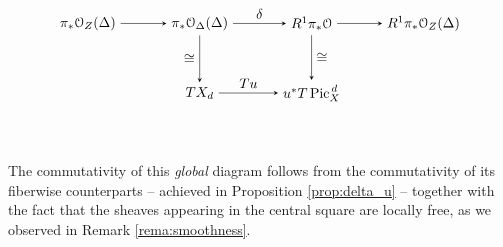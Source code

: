 		$$
		\begin{tikzpicture}[node distance=8em, auto]
			\node (A) 									{$\pi_* \calO_Z(\Delta)$};
			\node (B) 	[right of=A]		{$\pi_* \calO_\Delta(\Delta)$};
		  \node (C) 	[right of=B] 	{$R^1 \pi_* \calO$};
		  \node (D) 	[right of=C] 	{$R^1 \pi_* \calO_Z(\Delta)$};
		  \node (A') 	[below of=A] 		{$\;$};
		  \node (B') 	[below of=B, yshift=3em] 		{$ T \Dd$};
		  \node (C') 	[below of=C, yshift=3em] 		{$ u^* T \Pd $};
		  \node (D') 	[below of=D] 		{$\;$};
		  \draw[-stealth]					(A)		to node {} (B);
		  \draw[-stealth]					(B)		to node {$\delta$} (C);
		  \draw[-stealth]					(C)		to node {} (D);
		  \draw[-stealth]					(B')	to node {$\Tu$} (C');
		  \draw[-stealth][swap]		(B)		to node {$\cong$} (B');
		  \draw[-stealth]					(C)		to node {$\cong$} (C');
		\end{tikzpicture}
		\vspace{-2em}
		$$

		The commutativity of this \emph{global} diagram follows from the commutativity of its fiberwise counterparts -- achieved in Proposition \ref{prop:delta_u} -- together with the fact that the sheaves appearing in the central square are locally free, as we observed in Remark \ref{rema:smoothness}.




